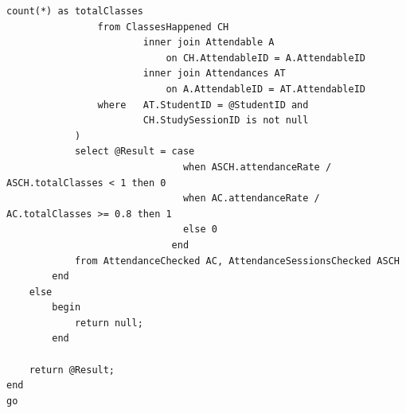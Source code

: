 \documentclass[11pt,a4paper]{article}
\begin{document}
\begin{Verbatim}[breaklines=true]
                    count(*) as totalClasses
                from ClassesHappened CH
                        inner join Attendable A 
                            on CH.AttendableID = A.AttendableID
                        inner join Attendances AT 
                            on A.AttendableID = AT.AttendableID
                where   AT.StudentID = @StudentID and 
                        CH.StudySessionID is not null
            )
            select @Result = case
                               when ASCH.attendanceRate / ASCH.totalClasses < 1 then 0
                               when AC.attendanceRate / AC.totalClasses >= 0.8 then 1
                               else 0
                             end
            from AttendanceChecked AC, AttendanceSessionsChecked ASCH
        end
    else
        begin
            return null;
        end

    return @Result;
end
go
\end{Verbatim}
\end{document}
